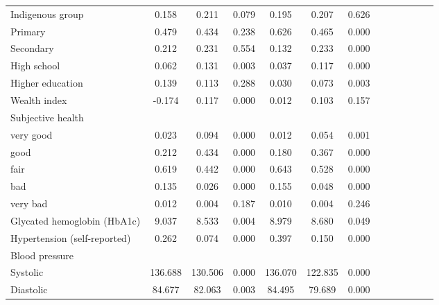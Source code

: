 \documentclass[10pt,letterpaper]{article}
\begin{document}
\begin{table}[!ht]
\begin{center}
\begin{adjustbox}{max width=\linewidth}
\begin{threeparttable}
{\begin{tabular}{l*{6}{S S}}
						Indigenous group    &       0.158&       0.211&       0.079&       0.195&       0.207&       0.626\\
						Primary             &       0.479&       0.434&       0.238&       0.626&       0.465&       0.000\\
						Secondary           &       0.212&       0.231&       0.554&       0.132&       0.233&       0.000\\
						High school         &       0.062&       0.131&       0.003&       0.037&       0.117&       0.000\\
						Higher education    &       0.139&       0.113&       0.288&       0.030&       0.073&       0.003\\
						Wealth index        &      -0.174&       0.117&       0.000&       0.012&       0.103&       0.157\\
						Subjective health       &&&&&&\\
						\hspace*{10mm}very good&       0.023&       0.094&       0.000&       0.012&       0.054&       0.001\\
						\hspace*{10mm}good     &       0.212&       0.434&       0.000&       0.180&       0.367&       0.000\\
						\hspace*{10mm}fair     &       0.619&       0.442&       0.000&       0.643&       0.528&       0.000\\
						\hspace*{10mm}bad      &       0.135&       0.026&       0.000&       0.155&       0.048&       0.000\\
						\hspace*{10mm}very bad &       0.012&       0.004&       0.187&       0.010&       0.004&       0.246\\
						Glycated hemoglobin (HbA1c)&       9.037&       8.533&       0.004&       8.979&       8.680&       0.049\\
						Hypertension (self-reported)       &       0.262&       0.074&       0.000&       0.397&       0.150&       0.000\\
						Blood pressure       &&&&&&\\
						\hspace*{10mm}Systolic             &     136.688&     130.506&       0.000&     136.070&     122.835&       0.000\\
						\hspace*{10mm}Diastolic            &      84.677&      82.063&       0.003&      84.495&      79.689&       0.000\\

\end{tabular}}
\end{threeparttable}
\end{adjustbox}
\end{center}
\end{table}
\end{document}
